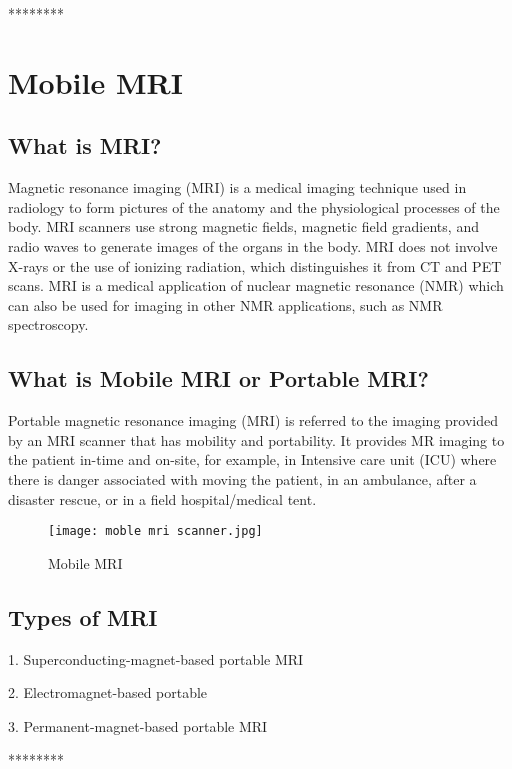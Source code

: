 \documentclass[11pt]{article}
\begin{document}
          \setlength{\parskip}{5em}
            \centering
                ********

 \setlength{\parskip}{0.5em}
\section{\Huge Mobile MRI}
\subsection{What is MRI?}
\Large Magnetic resonance imaging (MRI) is a medical imaging technique used in radiology to form pictures of the anatomy and the physiological processes of the body. MRI scanners use strong magnetic fields, magnetic field gradients, and radio waves to generate images of the organs in the body. MRI does not involve X-rays or the use of ionizing radiation, which distinguishes it from CT and PET scans. MRI is a medical application of nuclear magnetic resonance (NMR) which can also be used for imaging in other NMR applications, such as NMR spectroscopy.
\raggedright
\subsection{ What is Mobile MRI or Portable MRI?}



\raggedright \Large Portable magnetic resonance imaging (MRI) is referred to the imaging provided by an MRI scanner that has mobility and portability. It provides MR imaging to the patient in-time and on-site, for example, in Intensive care unit (ICU) where there is danger associated with moving the patient, in an ambulance, after a disaster rescue, or in a field hospital/medical tent.
\begin{figure}
\centering
\texttt{[image: moble mri scanner.jpg]}
\caption{Mobile MRI}
\end{figure}
\subsection{\Large Types of MRI}
1. \large Superconducting-magnet-based portable MRI

2. \large Electromagnet-based portable

3. \large Permanent-magnet-based portable MRI




\setlength{\parskip}{5em}
            \centering
                ********

 \setlength{\parskip}{1em}
\end{document}
